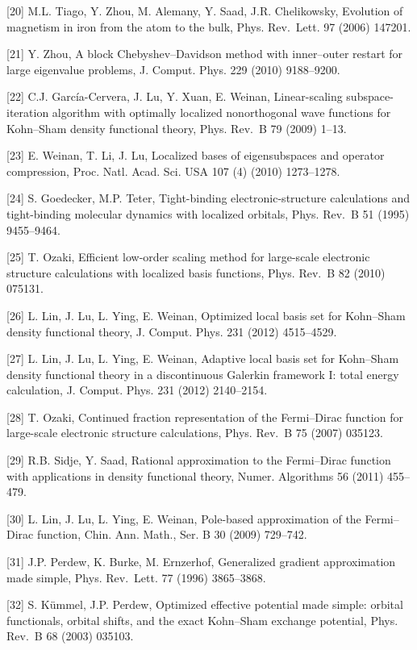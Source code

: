 \documentclass[
  10
]{article}
\begin{document}
{[}20{]} M.L. Tiago, Y. Zhou, M. Alemany, Y. Saad, J.R. Chelikowsky,
Evolution of magnetism in iron from the atom to the bulk, Phys.
Rev.~Lett. 97 (2006) 147201.

{[}21{]} Y. Zhou, A block Chebyshev--Davidson method with inner--outer
restart for large eigenvalue problems, J. Comput. Phys. 229 (2010)
9188--9200.

{[}22{]} C.J. García-Cervera, J. Lu, Y. Xuan, E. Weinan, Linear-scaling
subspace-iteration algorithm with optimally localized nonorthogonal wave
functions for Kohn--Sham density functional theory, Phys. Rev.~B 79
(2009) 1--13.

{[}23{]} E. Weinan, T. Li, J. Lu, Localized bases of eigensubspaces and
operator compression, Proc. Natl. Acad. Sci. USA 107 (4) (2010)
1273--1278.

{[}24{]} S. Goedecker, M.P. Teter, Tight-binding electronic-structure
calculations and tight-binding molecular dynamics with localized
orbitals, Phys. Rev.~B 51 (1995) 9455--9464.

{[}25{]} T. Ozaki, Efficient low-order scaling method for large-scale
electronic structure calculations with localized basis functions, Phys.
Rev.~B 82 (2010) 075131.

{[}26{]} L. Lin, J. Lu, L. Ying, E. Weinan, Optimized local basis set
for Kohn--Sham density functional theory, J. Comput. Phys. 231 (2012)
4515--4529.

{[}27{]} L. Lin, J. Lu, L. Ying, E. Weinan, Adaptive local basis set for
Kohn--Sham density functional theory in a discontinuous Galerkin
framework I: total energy calculation, J. Comput. Phys. 231 (2012)
2140--2154.

{[}28{]} T. Ozaki, Continued fraction representation of the Fermi--Dirac
function for large-scale electronic structure calculations, Phys. Rev.~B
75 (2007) 035123.

{[}29{]} R.B. Sidje, Y. Saad, Rational approximation to the Fermi--Dirac
function with applications in density functional theory, Numer.
Algorithms 56 (2011) 455--479.

{[}30{]} L. Lin, J. Lu, L. Ying, E. Weinan, Pole-based approximation of
the Fermi--Dirac function, Chin. Ann. Math., Ser. B 30 (2009) 729--742.

{[}31{]} J.P. Perdew, K. Burke, M. Ernzerhof, Generalized gradient
approximation made simple, Phys. Rev.~Lett. 77 (1996) 3865--3868.

{[}32{]} S. Kümmel, J.P. Perdew, Optimized effective potential made
simple: orbital functionals, orbital shifts, and the exact Kohn--Sham
exchange potential, Phys. Rev.~B 68 (2003) 035103.
\end{document}
